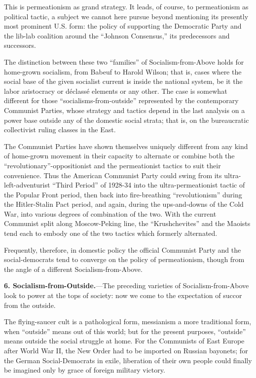 This is permeationism as grand strategy. It leads, of course, to permeationism as political tactic, a subject we cannot here pursue beyond mentioning its presently most prominent U.S. form: the policy of supporting the Democratic Party and the lib-lab coalition around the ``Johnson Consensus,'' its predecessors and successors.

The distinction between these two ``families'' of Socialism-from-Above holds for home-grown socialism, from Babeuf to Harold Wilson; that is, cases where the social base of the given socialist current is inside the national system, be it the labor aristocracy or d\'{e}class\'{e} elements or any other. The case is somewhat different for those ``socialisms-from-outside'' represented by the contemporary Communist Parties, whose strategy and tactics depend in the last analysis on a power base outside any of the domestic social strata; that is, on the bureaucratic collectivist ruling classes in the East.

The Communist Parties have shown themselves uniquely different from any kind of home-grown movement in their capacity to alternate or combine both the ``revolutionary''-oppositionist and the permeationist tactics to suit their convenience. Thus the American Communist Party could swing from its ultra-left-adventurist ``Third Period'' of 1928-34 into the ultra-permeationist tactic of the Popular Front period, then back into fire-breathing ``revolutionism'' during the Hitler-Stalin Pact period, and again, during the ups-and-downs of the Cold War, into various degrees of combination of the two. With the current Communist split along Moscow-Peking line, the ``Krushchevites'' and the Maoists tend each to embody one of the two tactics which formerly alternated.

Frequently, therefore, in domestic policy the official Communist Party and the social-democrats tend to converge on the policy of permeationism, though from the angle of a different Socialism-from-Above.

\textbf{6. Socialism-from-Outside.}---The preceding varieties of Socialism-from-Above look to power at the tops of society: now we come to the expectation of succor from the outside.

The flying-saucer cult is a pathological form, messianism a more traditional form, when ``outside'' means out of this world; but for the present purposes, ``outside'' means outside the social struggle at home. For the Communists of East Europe after World War II, the New Order had to be imported on Russian bayonets; for the German Social-Democrats in exile, liberation of their own people could finally be imagined only by grace of foreign military victory.

